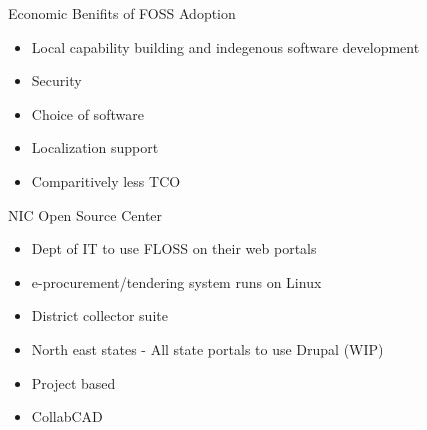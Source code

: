 \documentclass{beamer}
\begin{document}
	\begin{frame}{Economic Benifits of FOSS Adoption}
		\begin{itemize}[<+->]
			\item Local capability building and indegenous software development
			\item Security 
			\item Choice of software
			\item Localization support
			\item Comparitively less TCO
		\end{itemize}
	\end{frame}
	\begin{frame}{NIC Open Source Center}
		\begin{itemize}
			\item Dept of IT to use FLOSS on their web portals
			\item e-procurement/tendering system runs on Linux 
			\item District collector suite 
			\item North east states - All state portals to use Drupal (WIP)
			\item Project based
			\item CollabCAD
		\end{itemize}
	\end{frame}
\end{document}

